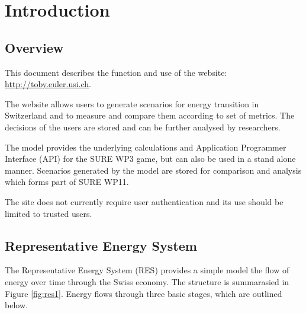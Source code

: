 \documentclass[notitlepage,a4paper]{article}
\begin{document}
\tableofcontents
\newpage

\section{Introduction}

\subsection{Overview}

This document describes the function and use of the website: \url{http://toby.euler.usi.ch}.

The website allows users to generate scenarios for energy transition in Switzerland and to measure and compare them according to set of metrics. The decisions of the users are stored and can be further analysed by researchers.

The model provides the underlying calculations and Application Programmer Interface (API) for the SURE WP3 game, but can also be used in a stand alone manner. Scenarios generated by the model are stored for comparison and analysis which forms part of SURE WP11. 

The site does not currently require user authentication and its use should be limited to trusted users.

\subsection{Representative Energy System}

The Representative Energy System (RES) provides a simple model the flow of energy over time through the Swiss economy. The structure is summarasied in Figure \ref{fig:res1}. Energy flows through three basic stages, which are outlined below.
\end{document}
